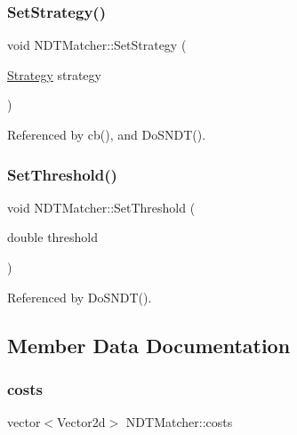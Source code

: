 \mbox{\label{classNDTMatcher_a74ba77ed2686918425795ef7019073f6}} 
\subsubsection{\texorpdfstring{Set\+Strategy()}{SetStrategy()}}
{\footnotesize\ttfamily void N\+D\+T\+Matcher\+::\+Set\+Strategy (\begin{DoxyParamCaption}\item[{\hyperlink{classNDTMatcher_a475619f9aa3d6a4f0dccad583c1306fb}{Strategy}}]{strategy }\end{DoxyParamCaption})\hspace{0.3cm}{\ttfamily [inline]}}



Referenced by cb(), and Do\+S\+N\+D\+T().

\mbox{\label{classNDTMatcher_aeec21189c3d79542190f8cdb3a16bb19}} 
\subsubsection{\texorpdfstring{Set\+Threshold()}{SetThreshold()}}
{\footnotesize\ttfamily void N\+D\+T\+Matcher\+::\+Set\+Threshold (\begin{DoxyParamCaption}\item[{double}]{threshold }\end{DoxyParamCaption})\hspace{0.3cm}{\ttfamily [inline]}}



Referenced by Do\+S\+N\+D\+T().



\subsection{Member Data Documentation}
\mbox{\label{classNDTMatcher_a795f1ce6b6bb89f47d91b0e8ca0473c8}} 
\subsubsection{\texorpdfstring{costs}{costs}}
{\footnotesize\ttfamily vector$<$Vector2d$>$ N\+D\+T\+Matcher\+::costs}

